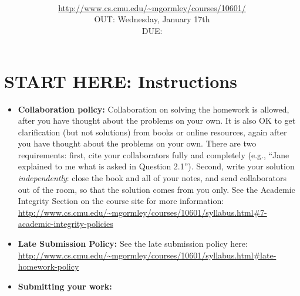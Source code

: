 \documentclass[11pt,addpoints,answers]{exam}
\title{\textsc{\hwName}
} %
\author{\courseName\\
\url{http://www.cs.cmu.edu/~mgormley/courses/10601/} \\
OUT: Wednesday, January 17th \\
DUE: \dueDate{} \\ 
}
\date{}
\date{}
\begin{document}
\maketitle

\section*{START HERE: Instructions}
\begin{itemize}
\item \textbf{Collaboration policy:} Collaboration on solving the homework is allowed, after you have thought about the problems on your own. It is also OK to get clarification (but not solutions) from books or online resources, again after you have thought about the problems on your own. There are two requirements: first, cite your collaborators fully and completely (e.g., ``Jane explained to me what is asked in Question 2.1''). Second, write your solution {\em independently}: close the book and all of your notes, and send collaborators out of the room, so that the solution comes from you only.  See the Academic Integrity Section on the course site for more information: \url{http://www.cs.cmu.edu/~mgormley/courses/10601/syllabus.html#7-academic-integrity-policies}

\item\textbf{Late Submission Policy:} See the late submission policy here: \url{http://www.cs.cmu.edu/~mgormley/courses/10601/syllabus.html#late-homework-policy}

\item\textbf{Submitting your work:} 

\begin{itemize}



\end{itemize}
\end{itemize}
\end{document}
